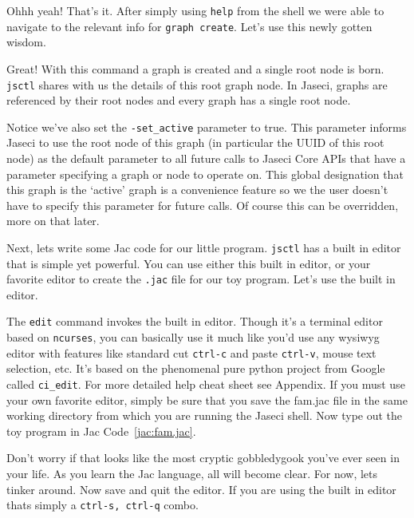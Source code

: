 \par
{}
\par
Ohhh yeah! That's it. After simply using \texttt{help} from the shell we were able to navigate to the relevant info for \texttt{graph create}. Let's use this newly gotten wisdom.
\par
{}
\par
Great! With this command a graph is created and a single root node is born. \texttt{jsctl} shares with us the details of this root graph node. In Jaseci, graphs are referenced by their root nodes and every graph has a single root node.
\par
Notice we've also set the \texttt{-set\_active} parameter to true. This parameter informs Jaseci to use the root node of this graph (in particular the UUID of this root node) as the default parameter to all future calls to Jaseci Core APIs that have a parameter specifying a graph or node to operate on. This global designation that this graph is the `active' graph is a convenience feature so we the user doesn't have to specify this parameter for future calls. Of course this can be overridden, more on that later.
\par
Next, lets write some Jac code for our little program. \texttt{jsctl} has a built in editor that is simple yet powerful. You can use either this built in editor, or your favorite editor to create the \texttt{.jac} file for our toy program. Let's use the built in editor.
\par
{}
\par
The \texttt{edit} command invokes the built in editor. Though it's a terminal editor based on \texttt{ncurses}, you can basically use it much like you'd use any wysiwyg editor with features like standard cut \texttt{ctrl-c} and paste \texttt{ctrl-v}, mouse text selection, etc. It's based on the phenomenal pure python project from Google called \texttt{ci\_edit}. For more detailed help cheat sheet see Appendix. If you must use your own favorite editor, simply be sure that you save the fam.jac file in the same working directory from which you are running the Jaseci shell. Now type out the toy program in Jac Code~\ref{jac:fam.jac}.
\par
{}
\par
Don't worry if that looks like the most cryptic \gls{gobbledygook} you've ever seen in your life. As you learn the Jac language, all will become clear. For now, lets tinker around. Now save and quit the editor. If you are using the built in editor thats simply a \texttt{ctrl-s, ctrl-q} combo.
